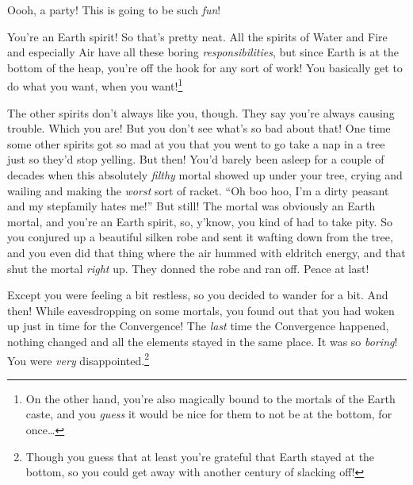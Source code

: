 \documentclass[char]{iron}
\begin{document}
\name{\cTrickster{}}



Oooh, a party! This is going to be such \emph{fun}!

You're an Earth spirit! So that's pretty neat. All the spirits of Water and Fire and especially Air have all these boring \emph{responsibilities}, but since Earth is at the bottom of the heap, you're off the hook for any sort of work! You basically get to do what you want, when you want!\footnote{On the other hand, you're also magically bound to the mortals of the Earth caste, and you \emph{guess} it would be nice for them to not be at the bottom, for once\ldots{}}

The other spirits don't always like you, though. They say you're always causing trouble. Which you are! But you don't see what's so bad about that! One time some other spirits got so mad at you that you went to go take a nap in a tree just so they'd stop yelling. But then! You'd barely been asleep for a couple of decades when this absolutely \emph{filthy} mortal showed up under your tree, crying and wailing and making the \emph{worst} sort of racket. ``Oh boo hoo, I'm a dirty peasant and my stepfamily hates me!'' But still! The mortal was obviously an Earth mortal, and you're an Earth spirit, so, y'know, you kind of had to take pity. So you conjured up a beautiful silken robe and sent it wafting down from the tree, and you even did that thing where the air hummed with eldritch energy, and that shut the mortal \emph{right} up. They donned the robe and ran off. Peace at last!

Except you were feeling a bit restless, so you decided to wander for a bit. And then! While eavesdropping on some mortals, you found out that you had woken up just in time for the Convergence! The \emph{last} time the Convergence happened, nothing changed and all the elements stayed in the same place. It was so \emph{boring}! You were \emph{very} disappointed.\footnote{Though you guess that at least you're grateful that Earth stayed at the bottom, so you could get away with another century of slacking off!}
\end{document}
